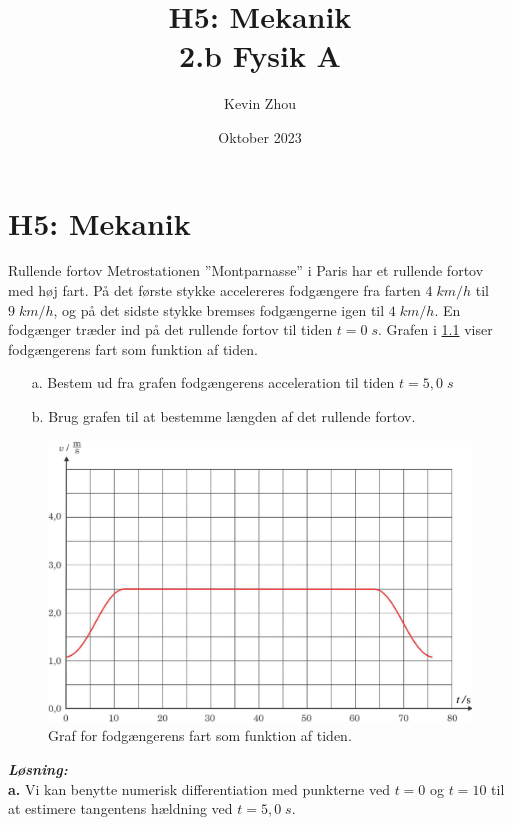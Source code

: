 \documentclass{report}
\title{H5: Mekanik\\
{\Large \textbf{2.b Fysik A}}}
\author{Kevin Zhou}
\date{Oktober 2023}
\newcommand{\sol}{\setlength{\parindent}{0cm}\textbf{\textit{Løsning:}}\setlength{\parindent}{1cm}}
\begin{document}
\maketitle
\chapter{H5: Mekanik}

\begin{question}{Rullende fortov}{}
Metrostationen ”Montparnasse” i Paris har et rullende fortov med høj fart. 
På det første stykke accelereres fodgængere fra farten $4 \;\unit{km/h}$  til $9 \;\unit{km/h} $, og på det sidste stykke bremses fodgængerne igen til $4 \;\unit{km/h}$.
  En fodgænger træder ind på det rullende fortov til tiden $t = 0 \;\unit{s} $. Grafen i \cref{fig:1} viser fodgængerens fart som funktion af tiden.
\begin{itemize}
  \item[a.] Bestem ud fra grafen fodgængerens acceleration til tiden $t=5,0 \;\unit{s} $
  \item[b.] Brug grafen til at bestemme længden af det rullende fortov.
\end{itemize}
\end{question}
\begin{figure}[h]
\begin{center}
  \includegraphics[scale=0.2]{H5_1.png}
\end{center}
\caption{Graf for fodgængerens fart som funktion af tiden.}
\label{fig:1}
\end{figure}
\sol \\ 
\textbf{a.} Vi kan benytte numerisk differentiation med punkterne ved $t=0$ og $t=10$ til at estimere tangentens hældning ved $t=5,0 \;\unit{s} $.
\end{document}
